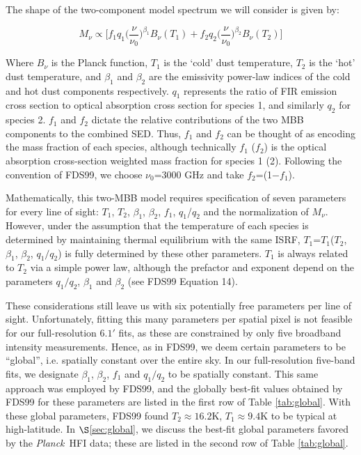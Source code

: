\documentclass{emulateapj}
\newcommand{\PLANCK}{{\it Planck}}
\begin{document}
The shape of the two-component model spectrum we will consider is given by:

\begin{equation}
M_{\nu} \propto \Big[f_{1}q_{1}\Big(\frac{\nu}{\nu_{0}}\Big)^{\beta_1}B_{\nu}(T_1) + f_{2}q_{2}\Big(\frac{\nu}{\nu_0}\Big)^{\beta_2}B_{\nu}(T_2)\Big]
\end{equation}

Where $B_{\nu}$ is the Planck function, $T_1$ is the `cold' dust temperature, 
$T_2$ is the `hot' dust temperature, and $\beta_1$ and $\beta_2$ are the
emissivity power-law indices of the cold and hot dust components respectively. 
$q_1$ represents the ratio of FIR emission cross section to optical absorption 
cross section for species 1, and similarly $q_2$ for species 2. $f_1$ and 
$f_2$ dictate the relative contributions of the two MBB components to the
combined SED. Thus, $f_1$ and $f_2$ can be thought of as encoding the mass 
fraction of each species, although technically $f_1$ ($f_2$) is the optical 
absorption cross-section weighted mass fraction for species 1 (2). Following 
the convention of FDS99, we choose $\nu_0$=3000 GHz and take $f_2$=(1$-$$f_1$).

Mathematically, this two-MBB model requires specification of seven 
parameters for every line of sight: $T_1$, $T_2$, $\beta_1$, $\beta_2$, $f_1$, 
$q_1$/$q_2$ and the normalization of $M_{\nu}$. However, under the 
assumption that the temperature of each species is determined by maintaining 
thermal equilibrium with the same ISRF, $T_1$=$T_1$($T_2$, $\beta_1$, 
$\beta_2$, $q_1/q_2$) is fully determined by these other parameters. $T_1$ is 
always related to $T_2$ via a simple power law, although the prefactor and 
exponent depend on the parameters $q_1/q_2$, $\beta_1$ and $\beta_2$ (see FDS99
Equation 14).

These considerations still leave us with six potentially free parameters per 
line of sight. Unfortunately, fitting this many parameters per spatial pixel is
not feasible for our full-resolution $6.1$$'$ fits, as these are constrained by
only five broadband intensity measurements. Hence, as in FDS99, we deem certain
 parameters to be ``global'', i.e. spatially constant over the entire sky. In 
our full-resolution five-band fits, we designate $\beta_1$, $\beta_2$, $f_1$ 
and $q_1/q_2$ to be spatially constant. This same approach was employed by 
FDS99, and the globally best-fit values obtained by FDS99 for these parameters 
are listed in the first row of Table \ref{tab:global}. With these global 
parameters, FDS99 found $T_2$$\approx$$16.2$K, $T_1$$\approx$$9.4$K to be 
typical at high-latitude. In $\S$\ref{sec:global}, we discuss the best-fit 
global parameters favored by the \PLANCK~HFI data; these are listed in the 
second row of Table \ref{tab:global}.
\end{document}
